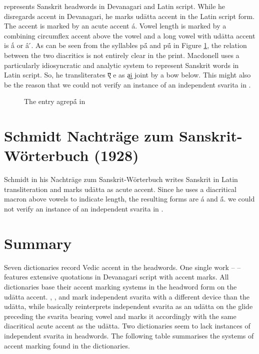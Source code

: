 \citet{md} represents Sanskrit headwords in Devanagari and Latin script. While he disregards accent in Devanagari, he marks udātta accent in the Latin script form. The accent is marked by an acute accent á. Vowel length is marked by a combining circumflex accent above the vowel and a long vowel with udātta accent is ấ or â ́. As can be seen from the syllables pā́ and pū́ in Figure \ref{fig:macdonnell-agrepA}, the relation between the two diacritics is not entirely clear in the print. Macdonell uses a particularly idiosyncratic and analytic system to represent Sanskrit words in Latin script. So, he transliterates {\devfont ए} e as a͜i joint by a bow below. This might also be the reason that we could not verify an instance of an independent svarita in \citet{md}.

\begin{figure}[!ht]
\begin{center}
\end{center}
\caption[The entry agrepā́  in \citet{md}]{\label{fig:macdonnell-agrepA}The entry agrepā́ in \citet{md}}
\end{figure}

\section{Schmidt Nachträge zum Sanskrit-Wörterbuch (1928)}

Schmidt in his Nachträge zum Sanskrit-Wörterbuch \citep{sch} writes Sanskrit in Latin transliteration and marks udātta as acute accent. Since he uses a diacritical macron above vowels to indicate length, the resulting forms are á and ā́. we could not verify an instance of an independent svarita in \citet{sch}.

\section{Summary}

Seven dictionaries record Vedic accent in the headwords. One single work – \citet{pwg} – features extensive quotations in Devanagari script with accent marks. All dictionaries base their accent marking systems in the headword form on the udātta accent. \citet{pwg}, \citet{mw}, and \citet{ccs,cae} mark independent svarita with a different device than the udātta, while \citet{gra} basically reinterprets independent svarita as an udātta on the glide preceding the svarita bearing vowel and marks it accordingly with the same diacritical acute accent as the udātta. Two dictionaries \citep{md,sch} seem to lack instances of independent svarita in headwords. The following table summarises the systems of accent marking found in the dictionaries.

